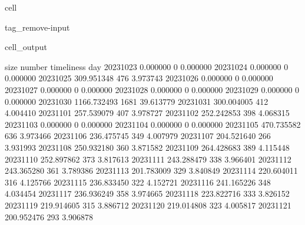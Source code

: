\documentclass[letterpaper,10pt,english]{jupyterBook}
\begin{document}
\begin{sphinxuseclass}{cell}
\begin{sphinxuseclass}{tag_remove-input}\begin{sphinxVerbatimOutput}

\begin{sphinxuseclass}{cell_output}
\begin{sphinxVerbatim}[commandchars=\\\{\}]
                   size  number  timeliness
day                                        
2023\PYGZhy{}10\PYGZhy{}23     0.000000       0    0.000000
2023\PYGZhy{}10\PYGZhy{}24     0.000000       0    0.000000
2023\PYGZhy{}10\PYGZhy{}25   309.951348     476    3.973743
2023\PYGZhy{}10\PYGZhy{}26     0.000000       0    0.000000
2023\PYGZhy{}10\PYGZhy{}27     0.000000       0    0.000000
2023\PYGZhy{}10\PYGZhy{}28     0.000000       0    0.000000
2023\PYGZhy{}10\PYGZhy{}29     0.000000       0    0.000000
2023\PYGZhy{}10\PYGZhy{}30  1166.732493    1681   39.613779
2023\PYGZhy{}10\PYGZhy{}31   300.004005     412    4.004410
2023\PYGZhy{}11\PYGZhy{}01   257.539079     407    3.978727
2023\PYGZhy{}11\PYGZhy{}02   252.242853     398    4.068315
2023\PYGZhy{}11\PYGZhy{}03     0.000000       0    0.000000
2023\PYGZhy{}11\PYGZhy{}04     0.000000       0    0.000000
2023\PYGZhy{}11\PYGZhy{}05   470.735582     636    3.973466
2023\PYGZhy{}11\PYGZhy{}06   236.475745     349    4.007979
2023\PYGZhy{}11\PYGZhy{}07   204.521640     266    3.931993
2023\PYGZhy{}11\PYGZhy{}08   250.932180     360    3.871582
2023\PYGZhy{}11\PYGZhy{}09   264.428683     389    4.115448
2023\PYGZhy{}11\PYGZhy{}10   252.897862     373    3.817613
2023\PYGZhy{}11\PYGZhy{}11   243.288479     338    3.966401
2023\PYGZhy{}11\PYGZhy{}12   243.365280     361    3.789386
2023\PYGZhy{}11\PYGZhy{}13   201.783009     329    3.840849
2023\PYGZhy{}11\PYGZhy{}14   220.604011     316    4.125766
2023\PYGZhy{}11\PYGZhy{}15   236.833450     322    4.152721
2023\PYGZhy{}11\PYGZhy{}16   241.165226     348    4.034454
2023\PYGZhy{}11\PYGZhy{}17   236.936249     358    3.974665
2023\PYGZhy{}11\PYGZhy{}18   223.822716     333    3.826152
2023\PYGZhy{}11\PYGZhy{}19   219.914605     315    3.886712
2023\PYGZhy{}11\PYGZhy{}20   219.014808     323    4.005817
2023\PYGZhy{}11\PYGZhy{}21   200.952476     293    3.906878
\end{sphinxVerbatim}

\end{sphinxuseclass}\end{sphinxVerbatimOutput}

\end{sphinxuseclass}
\end{sphinxuseclass}
\sphinxstepscope
\end{document}
